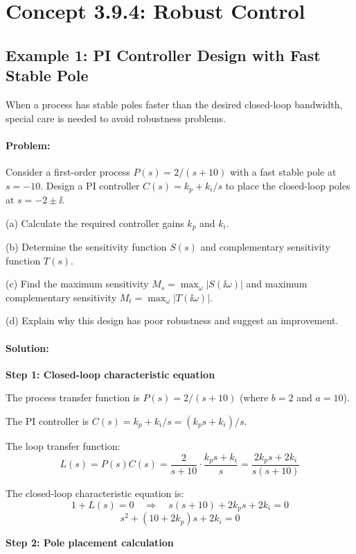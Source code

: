 \documentclass[11pt,a4paper]{article}
\begin{document}
\section{Concept 3.9.4: Robust Control}

\subsection{Example 1: PI Controller Design with Fast Stable Pole}

When a process has stable poles faster than the desired closed-loop bandwidth, special care is needed to avoid robustness problems.

\paragraph{Problem:}
Consider a first-order process $P(s) = 2/(s+10)$ with a fast stable pole at $s = -10$. Design a PI controller $C(s) = k_p + k_i/s$ to place the closed-loop poles at $s = -2 \pm \ii$.

(a) Calculate the required controller gains $k_p$ and $k_i$.

(b) Determine the sensitivity function $S(s)$ and complementary sensitivity function $T(s)$.

(c) Find the maximum sensitivity $M_s = \max_\omega |S(\ii\omega)|$ and maximum complementary sensitivity $M_t = \max_\omega |T(\ii\omega)|$.

(d) Explain why this design has poor robustness and suggest an improvement.

\paragraph{Solution:}

\textbf{Step 1: Closed-loop characteristic equation}

The process transfer function is $P(s) = 2/(s+10)$ (where $b = 2$ and $a = 10$).

The PI controller is $C(s) = k_p + k_i/s = (k_ps + k_i)/s$.

The loop transfer function:
\[
L(s) = P(s)C(s) = \frac{2}{s+10} \cdot \frac{k_ps + k_i}{s} = \frac{2k_ps + 2k_i}{s(s+10)}
\]

The closed-loop characteristic equation is:
\[
1 + L(s) = 0 \quad \Rightarrow \quad s(s+10) + 2k_ps + 2k_i = 0
\]
\[
s^2 + (10 + 2k_p)s + 2k_i = 0
\]

\textbf{Step 2: Pole placement calculation}
\end{document}
